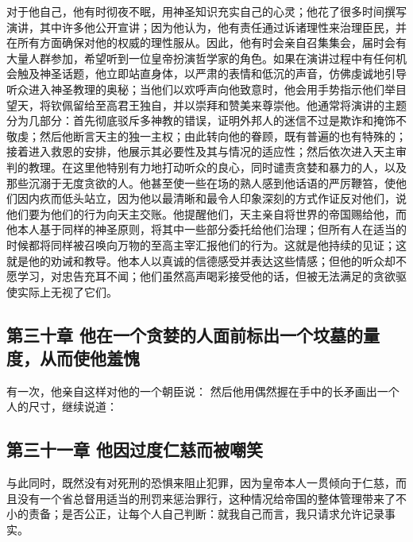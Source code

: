 对于他自己，他有时彻夜不眠，用神圣知识充实自己的心灵；他花了很多时间撰写演讲，其中许多他公开宣讲；因为他认为，他有责任通过诉诸理性来治理臣民，并在所有方面确保对他的权威的理性服从。因此，他有时会亲自召集集会，届时会有大量人群参加，希望听到一位皇帝扮演哲学家的角色。如果在演讲过程中有任何机会触及神圣话题，他立即站直身体，以严肃的表情和低沉的声音，仿佛虔诚地引导听众进入神圣教理的奥秘；当他们以欢呼声向他致意时，他会用手势指示他们举目望天，将钦佩留给至高君王独自，并以崇拜和赞美来尊崇他。他通常将演讲的主题分为几部分：首先彻底驳斥多神教的错误，证明外邦人的迷信不过是欺诈和掩饰不敬虔；然后他断言天主的独一主权；由此转向他的眷顾，既有普遍的也有特殊的；接着进入救恩的安排，他展示其必要性及其与情况的适应性；然后依次进入天主审判的教理。在这里他特别有力地打动听众的良心，同时谴责贪婪和暴力的人，以及那些沉溺于无度贪欲的人。他甚至使一些在场的熟人感到他话语的严厉鞭笞，使他们因内疚而低头站立，因为他以最清晰和最令人印象深刻的方式作证反对他们，说他们要为他们的行为向天主交账。他提醒他们，天主亲自将世界的帝国赐给他，而他本人基于同样的神圣原则，将其中一些部分委托给他们治理；但所有人在适当的时候都将同样被召唤向万物的至高主宰汇报他们的行为。这就是他持续的见证；这就是他的劝诫和教导。他本人以真诚的信德感受并表达这些情感；但他的听众却不愿学习，对忠告充耳不闻；他们虽然高声喝彩接受他的话，但被无法满足的贪欲驱使实际上无视了它们。\par


\subsection{第三十章 他在一个贪婪的人面前标出一个坟墓的量度，从而使他羞愧}

有一次，他亲自这样对他的一个朝臣说： 然后他用偶然握在手中的长矛画出一个人的尺寸，继续说道：\par


\subsection{第三十一章 他因过度仁慈而被嘲笑}

与此同时，既然没有对死刑的恐惧来阻止犯罪，因为皇帝本人一贯倾向于仁慈，而且没有一个省总督用适当的刑罚来惩治罪行，这种情况给帝国的整体管理带来了不小的责备；是否公正，让每个人自己判断：就我自己而言，我只请求允许记录事实。\par

